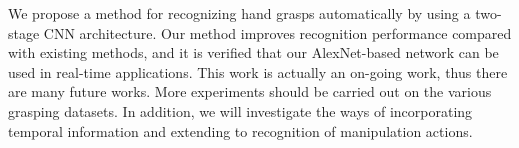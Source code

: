 \documentclass[10pt,twocolumn,letterpaper]{article}
\begin{document}
We propose a method for recognizing hand grasps automatically by using a two-stage CNN architecture. Our method improves recognition performance compared with existing methods, and it is verified that our AlexNet-based network can be used in real-time applications. This work is actually an on-going work, thus there are many future works. More experiments should be carried out on the various grasping datasets. In addition, we will investigate the ways of incorporating temporal information and extending to recognition of manipulation actions.


\end{document}
